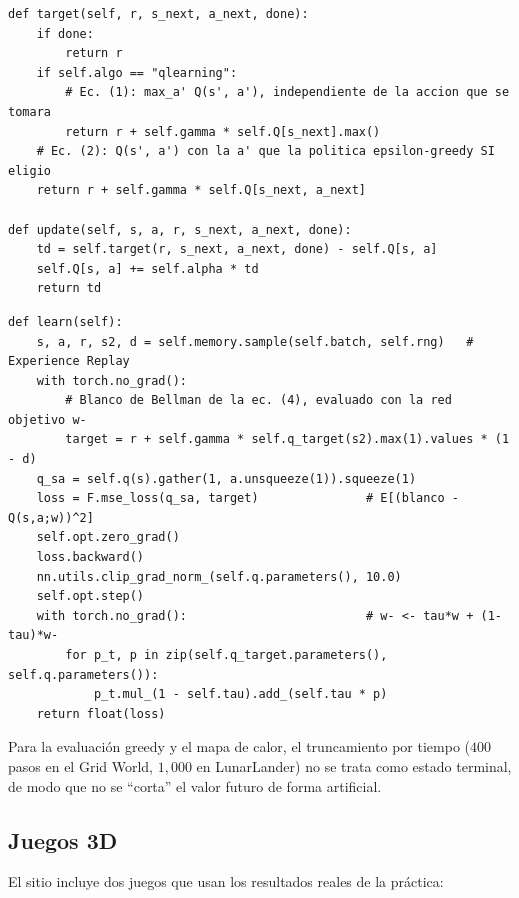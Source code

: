 \documentclass[11pt]{article}
\begin{document}
\begin{lstlisting}[style=py, caption={Blanco TD y actualización del \texttt{AgenteRL} (extracto de \texttt{agents.py}).}]
def target(self, r, s_next, a_next, done):
    if done:
        return r
    if self.algo == "qlearning":
        # Ec. (1): max_a' Q(s', a'), independiente de la accion que se tomara
        return r + self.gamma * self.Q[s_next].max()
    # Ec. (2): Q(s', a') con la a' que la politica epsilon-greedy SI eligio
    return r + self.gamma * self.Q[s_next, a_next]

def update(self, s, a, r, s_next, a_next, done):
    td = self.target(r, s_next, a_next, done) - self.Q[s, a]
    self.Q[s, a] += self.alpha * td
    return td
\end{lstlisting}

\begin{lstlisting}[style=py, caption={Paso de aprendizaje de DQN con red objetivo (extracto de \texttt{dqn\_lunar.py}).}]
def learn(self):
    s, a, r, s2, d = self.memory.sample(self.batch, self.rng)   # Experience Replay
    with torch.no_grad():
        # Blanco de Bellman de la ec. (4), evaluado con la red objetivo w-
        target = r + self.gamma * self.q_target(s2).max(1).values * (1 - d)
    q_sa = self.q(s).gather(1, a.unsqueeze(1)).squeeze(1)
    loss = F.mse_loss(q_sa, target)               # E[(blanco - Q(s,a;w))^2]
    self.opt.zero_grad()
    loss.backward()
    nn.utils.clip_grad_norm_(self.q.parameters(), 10.0)
    self.opt.step()
    with torch.no_grad():                         # w- <- tau*w + (1-tau)*w-
        for p_t, p in zip(self.q_target.parameters(), self.q.parameters()):
            p_t.mul_(1 - self.tau).add_(self.tau * p)
    return float(loss)
\end{lstlisting}

Para la evaluación greedy y el mapa de calor, el truncamiento por tiempo
($400$ pasos en el Grid World, $1{,}000$ en LunarLander) no se trata como estado
terminal, de modo que no se ``corta'' el valor futuro de forma artificial.

\subsection{Juegos 3D}

El sitio incluye dos juegos que usan los resultados reales de la práctica:
\end{document}
